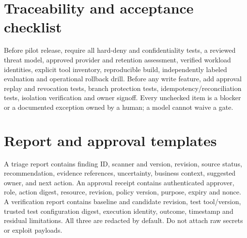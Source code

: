 \documentclass[11pt,letterpaper]{article}
\begin{document}
\section{Traceability and acceptance checklist}
\begin{traceability}
\end{traceability}
Before pilot release, require all hard-deny and confidentiality tests, a reviewed threat model, approved provider and retention assessment, verified workload identities, explicit tool inventory, reproducible build, independently labeled evaluation and operational rollback drill. Before any write feature, add approval replay and revocation tests, branch protection tests, idempotency/reconciliation tests, isolation verification and owner signoff. Every unchecked item is a blocker or a documented exception owned by a human; a model cannot waive a gate.

\appendix
\section{Report and approval templates}
A triage report contains finding ID, scanner and version, revision, source status, recommendation, evidence references, uncertainty, business context, suggested owner, and next action. An approval receipt contains authenticated approver, role, action digest, resource, revision, policy version, purpose, expiry and nonce. A verification report contains baseline and candidate revision, test tool/version, trusted test configuration digest, execution identity, outcome, timestamp and residual limitations. All three are redacted by default. Do not attach raw secrets or exploit payloads.
\end{document}
